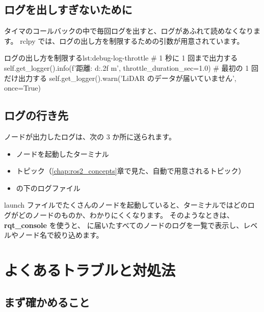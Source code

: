 \subsection{ログを出しすぎないために}

タイマのコールバックの中で毎回ログを出すと、ログがあふれて読めなくなります。
rclpy では、ログの出し方を制限するための引数が用意されています。

\begin{codelisting}[style=python]{ログの出し方を制限する}{lst:debug-log-throttle}
# 1 秒に 1 回まで出力する
self.get_logger().info(f'距離: {d:.2f} m', throttle_duration_sec=1.0)
# 最初の 1 回だけ出力する
self.get_logger().warn('LiDAR のデータが届いていません', once=True)
\end{codelisting}

\subsection{ログの行き先}

ノードが出力したログは、次の 3 か所に送られます。

\begin{itemize}
  \item ノードを起動したターミナル
  \item {} トピック（\ref{chap:ros2_concepts}章で見た、自動で用意されるトピック）
  \item {} の下のログファイル
\end{itemize}

launch ファイルでたくさんのノードを起動していると、ターミナルではどのログがどのノードのものか、わかりにくくなります。
そのようなときは、\textbf{rqt\_console} を使うと、 に届いたすべてのノードのログを一覧で表示し、レベルやノード名で絞り込めます。


\section{よくあるトラブルと対処法}
\label{sec:debug-trouble}

\subsection{まず確かめること}

